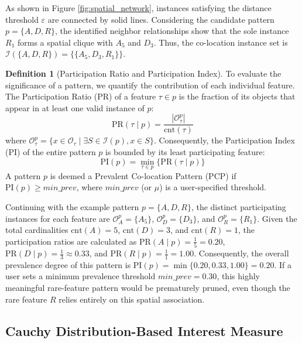 \documentclass[12pt, letterpaper]{template}
\theoremstyle{definition}
\newtheorem{definition}{Definition}
\begin{document}
As shown in Figure \ref{fig:spatial_network}, instances satisfying the distance threshold $\varepsilon$ are connected by solid lines. Considering the candidate pattern $p = \{A, D, R\}$, the identified neighbor relationships show that the sole instance $R_{1}$ forms a spatial clique with $A_{5}$ and $D_{3}$. Thus, the co-location instance set is $\mathcal{I}(\{A,D,R\}) = \{\{A_5, D_3, R_1\}\}$.

\begin{definition}[Participation Ratio and Participation Index]
To evaluate the significance of a pattern, we quantify the contribution of each individual feature. The Participation Ratio (PR) of a feature $\tau \in p$ is the fraction of its objects that appear in at least one valid instance of $p$:
\begin{equation}
\text{PR}(\tau \mid p) = \frac{|\mathcal{O}_\tau^p|}{\text{cnt}(\tau)}
\end{equation}
where $\mathcal{O}_\tau^p = \{x \in \mathcal{O}_\tau \mid \exists S \in \mathcal{I}(p), x \in S\}$. Consequently, the Participation Index (PI) of the entire pattern $p$ is bounded by its least participating feature:
\begin{equation}
\text{PI}(p) = \min_{\tau\in p} \{ \text{PR}(\tau \mid p) \}
\end{equation}
A pattern $p$ is deemed a Prevalent Co-location Pattern (PCP) if $\text{PI}(p) \ge \textit{min\_prev}$, where $\textit{min\_prev}$ (or $\mu$) is a user-specified threshold.
\end{definition}

Continuing with the example pattern $p = \{A, D, R\}$, the distinct participating instances for each feature are $\mathcal{O}_A^p = \{A_5\}$, $\mathcal{O}_D^p = \{D_3\}$, and $\mathcal{O}_R^p = \{R_1\}$. Given the total cardinalities $\text{cnt}(A)=5$, $\text{cnt}(D)=3$, and $\text{cnt}(R)=1$, the participation ratios are calculated as $\text{PR}(A \mid p) = \frac{1}{5} = 0.20$, $\text{PR}(D \mid p) = \frac{1}{3} \approx 0.33$, and $\text{PR}(R \mid p) = \frac{1}{1} = 1.00$. Consequently, the overall prevalence degree of this pattern is $\text{PI}(p) = \min \{0.20, 0.33, 1.00\} = 0.20$. If a user sets a minimum prevalence threshold $\textit{min\_prev} = 0.30$, this highly meaningful rare-feature pattern would be prematurely pruned, even though the rare feature $R$ relies entirely on this spatial association.

\subsection{Cauchy Distribution-Based Interest Measure}
\label{sec:cauchy} 
\end{document}
